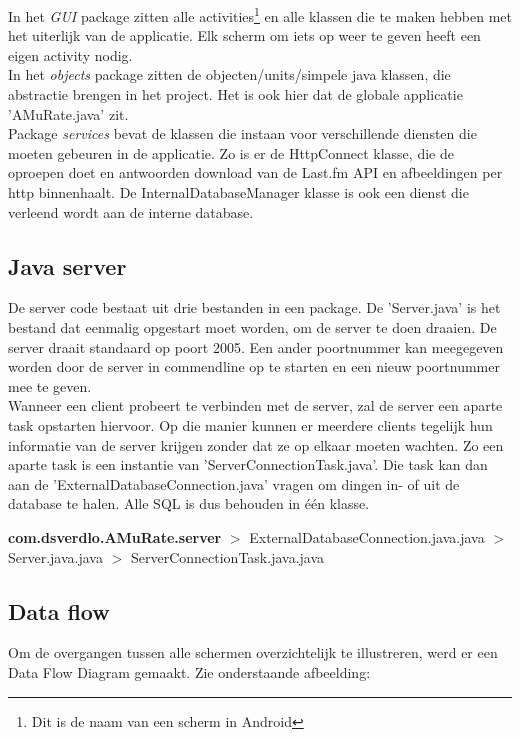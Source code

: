 \documentclass[11pt,a4paper]{article}
\newcommand{\pack}[1]{$>$ #1.java \newline}
\begin{document}
		 In het \textit{GUI} package zitten alle activities\footnote{Dit is de naam van een scherm in Android} en alle klassen die te maken hebben met het uiterlijk van de applicatie. Elk scherm om iets op weer te geven heeft een eigen activity nodig. \\
		In het \textit{objects} package zitten de objecten/units/simpele java klassen, die abstractie brengen in het project. Het is ook hier dat de globale applicatie 'AMuRate.java' zit.  \\
		Package \textit{services} bevat de klassen die instaan voor verschillende diensten die moeten gebeuren in de applicatie. Zo is er de HttpConnect klasse, die de oproepen doet en antwoorden download van de Last.fm API en afbeeldingen per http binnenhaalt. De InternalDatabaseManager klasse is ook een dienst die verleend wordt aan de interne database.

	\subsection{Java server}
	\label{sec:Java server}
	De server code bestaat uit drie bestanden in een package. De 'Server.java' is het bestand dat eenmalig opgestart moet worden, om de server te doen draaien. De server draait standaard op poort 2005. Een ander poortnummer kan meegegeven worden door de server in commendline op te starten en een nieuw poortnummer mee te geven. \\
	Wanneer een client probeert te verbinden met de server, zal de server een aparte task opstarten hiervoor. Op die manier kunnen er meerdere clients tegelijk hun informatie van de server krijgen zonder dat ze op elkaar moeten wachten. Zo een aparte task is een instantie van 'ServerConnectionTask.java'. Die task kan dan aan de 'ExternalDatabaseConnection.java' vragen om dingen in- of uit de database te halen. Alle SQL is dus behouden in één klasse.
	
	\textbf{com.dsverdlo.AMuRate.server} \newline
	\pack{ExternalDatabaseConnection.java}
	\pack{Server.java}
	\pack{ServerConnectionTask.java}
	
	\subsection{Data flow}
	\label{sec:Data flow}
	Om de overgangen tussen alle schermen overzichtelijk te illustreren, werd er een Data Flow Diagram gemaakt. Zie onderstaande afbeelding: \newline
	
\end{document}
